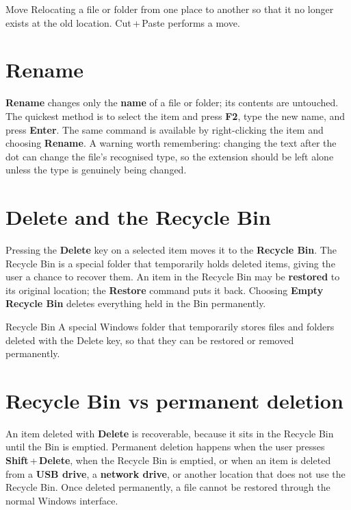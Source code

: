 \begin{definitionbox}{Move}
Relocating a file or folder from one place to another so that it no longer
exists at the old location. Cut\,+\,Paste performs a move.
\end{definitionbox}

\section{Rename}
\textbf{Rename} changes only the \textbf{name} of a file or folder; its
contents are untouched. The quickest method is to select the item and press
\textbf{F2}, type the new name, and press \textbf{Enter}. The same command is
available by right-clicking the item and choosing \textbf{Rename}. A warning
worth remembering: changing the text after the dot can change the file's
recognised type, so the extension should be left alone unless the type is
genuinely being changed.

\section{Delete and the Recycle Bin}
Pressing the \textbf{Delete} key on a selected item moves it to the
\textbf{Recycle Bin}. The Recycle Bin is a special folder that temporarily
holds deleted items, giving the user a chance to recover them. An item in the
Recycle Bin may be \textbf{restored} to its original location; the
\textbf{Restore} command puts it back. Choosing \textbf{Empty Recycle Bin}
deletes everything held in the Bin permanently.

\begin{definitionbox}{Recycle Bin}
A special Windows folder that temporarily stores files and folders deleted
with the Delete key, so that they can be restored or removed permanently.
\end{definitionbox}

\section{Recycle Bin vs permanent deletion}
An item deleted with \textbf{Delete} is recoverable, because it sits in the
Recycle Bin until the Bin is emptied. Permanent deletion happens when the
user presses \textbf{Shift}\,+\,\textbf{Delete}, when the Recycle Bin is
emptied, or when an item is deleted from a \textbf{USB drive}, a
\textbf{network drive}, or another location that does not use the Recycle
Bin. Once deleted permanently, a file cannot be restored through the normal
Windows interface.

